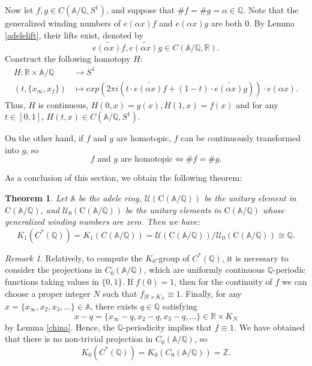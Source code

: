 \documentclass[11pt]{article}
\newtheorem{theorem}{Theorem}[section]  %
\newcommand{\Q}{\mathbb{Q}}
\newcommand{\A}{\mathbb{A}}
\theoremstyle{remark}
\newtheorem{remark}{Remark}[section] %
\begin{document}
    Now let \( f, g \in C(\A/\mathbb{Q}, S^1) \), and suppose that \( \#f = \#g = \alpha \in \mathbb{Q} \). Note that the generalized winding numbers of \( e(\alpha x)f \) and \( e(\alpha x)g  \) are both 0. By Lemma \ref{adelelift}, their lifts exist, denoted by 
\[
\widetilde{e(\alpha x)f},\widetilde{e(\alpha x)g} \in C(\A/\mathbb{Q}, \mathbb{R}).
\]
Construct the following homotopy \( H \):
\begin{align*}
H: \mathbb{R} \times \A/\mathbb{Q} &\to S^1 \\
(t, \{x_\infty, x_f\}) &\mapsto exp(2\pi i \left( t \cdot \widetilde{e(\alpha x)f} + (1-t) \cdot \widetilde{e(\alpha x)g} \right)) \cdot e(\alpha x).
\end{align*}
Thus, \(H\) is continuous, \(H(0,x)=g(x), H(1,x)=f(x)\) and for any $t\in [0,1]$, $H(t,x)\in C(\A/\mathbb{Q}, S^1)$. 

On the other hand, if \( f \) and \( g \) are homotopic, \(f\) can be continuously transformed into \( g \), so 
\[ f \text{ and }g \text{ are homotopic}\Leftrightarrow\#f=\#g .\]

As a conclusion of this section, we obtain the following theorem:
\begin{theorem}\label{K1Q}
    Let $\A$ be the adele ring, $\mathcal{U}(\text{C}(\A/\mathbb{Q}))$ be the unitary element in $\text{C}(\A/\mathbb{Q})$, and  $\mathcal{U}_0(\text{C}(\A/\mathbb{Q}))$ be the unitary elements in $\text{C}(\A/\mathbb{Q})$ whose generalized winding numbers are zero. Then we have: 
    \[
    K_1(C^*(\mathbb{Q}))=K_1(C(\A/\mathbb{Q}))=\mathcal{U}(\text{C}(\A/\mathbb{Q}))/\mathcal{U}_0(\text{C}(\A/\mathbb{Q}))\cong\mathbb{Q}.
    \]
    \end{theorem}
    \begin{remark}\label{K0Q}
        Relatively, to compute the \( K_0 \)-group of \( C^*(\Q) \), it is necessary to consider the projections in \( C_0(\A/\Q) \), which are uniformly continuous \( \Q \)-periodic functions taking values in \( \{0, 1\} \).
        If $f(0)=1$, then for the continuity of $f$ we can choose a proper integer $N$ such that $f_{|\mathbb{R}\times K_N}\equiv 1$. Finally, for any $x=\{x_\infty,x_2,x_3,\dots\}\in \A$,  there exists $q\in \Q$ satisfying
        \[
        x-q=\{x_\infty-q,x_2-q,x_3-q,\dots\}\in \mathbb{R}\times K_N
        \]
by Lemma \ref{china}. Hence, the $\Q$-periodicity implies that $f\equiv 1$. We have obtained that there is no non-trivial projection in \( C_0(\A/\Q) \), so 
\[
K_0(C^*(\Q))=K_0(C_0(\A/\Q))=\mathbb{Z}.
\]
    \end{remark}
\end{document}
